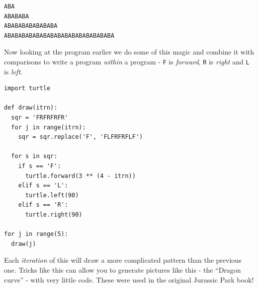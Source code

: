 \documentclass[a4paper, 11pt]{book}
\begin{document}
{\small
\begin{verbatim}
ABA
ABABABA
ABABABABABABABA
ABABABABABABABABABABABABABABABA
\end{verbatim}
}

\noindent
Now looking at the program earlier we do some of this magic and
combine it with comparisons to write a program \emph{within} a program
- \verb|F| is \emph{forward}, \verb|R| is \emph{right} and \verb|L| is
\emph{left}.

{\small
\begin{verbatim}
import turtle

def draw(itrn):
  sqr = 'FRFRFRFR'
  for j in range(itrn):
    sqr = sqr.replace('F', 'FLFRFRFLF')
    
  for s in sqr:
    if s == 'F':
      turtle.forward(3 ** (4 - itrn))
    elif s == 'L':
      turtle.left(90)
    elif s == 'R':
      turtle.right(90)

for j in range(5):
  draw(j)
\end{verbatim}
}

\noindent
Each \emph{iteration} of this will draw a more complicated pattern
than the previous one. Tricks like this can allow you to generate
pictures like this - the ``Dragon curve'' - with very little
code. These were used in the original Jurassic Park book!
\end{document}
